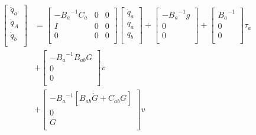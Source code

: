 \begin{equation}
	\begin{split}
		\left[\begin{matrix}\ddot{q}_a\\\dot{q}_A\\\dot{q}_b\\\end{matrix}\right]&=\left[\begin{matrix}-{B_a}^{-1}C_a&0&0\\I&0&0\\0&0&0\\\end{matrix}\right]\left[\begin{matrix}\dot{q}_a\\q_a\\q_b\\\end{matrix}\right]+\left[\begin{matrix}{{-B}_a}^{-1}g\\0\\0\\\end{matrix}\right]+\left[\begin{matrix}{B_a}^{-1}\\0\\0\\\end{matrix}\right]\tau_a\\&+\left[\begin{matrix}-{B_a}^{-1}B_{ab}G\\0\\0\\\end{matrix}\right]\dot{v}\\&+\left[\begin{matrix}-{B_a}^{-1}\left[B_{ab}\dot{G}+C_{ab}G\right]\\0\\G\\\end{matrix}\right]v 
	\end{split}
\end{equation}
